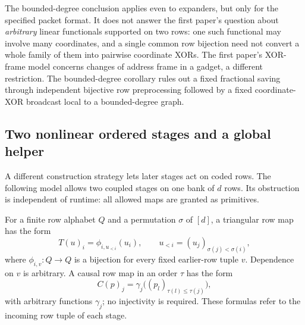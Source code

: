 The bounded-degree conclusion applies even to expanders, but only for the
specified packet format.  It does not answer the first paper's question about
\emph{arbitrary} linear functionals supported on two rows: one such functional
may involve many coordinates, and a single common row bijection need not
convert a whole family of them into pairwise coordinate XORs.
The first paper's XOR-frame model concerns changes of address frame in a
gadget, a different restriction.  The bounded-degree corollary rules out a
fixed fractional saving through independent bijective row preprocessing
followed by a fixed coordinate-XOR broadcast local to a bounded-degree graph.

\subsection{Two nonlinear ordered stages and a global helper}\label{subsec:local-two-stage}

A different construction strategy lets later stages act on coded rows.
The following model allows two coupled stages on one bank of $d$ rows.
Its obstruction is independent of runtime: all allowed maps are granted as
primitives.

\begin{definition}\label{def:local-triangular-causal}
For a finite row alphabet $Q$ and a permutation $\sigma$ of $[d]$, a triangular
row map has the form
\[
  T(u)_i=\phi_{i,u_{<i}}(u_i),\qquad
  u_{<i}=(u_j)_{\sigma(j)<\sigma(i)},
\]
where $\phi_{i,v}:Q\to Q$ is a bijection for every fixed earlier-row tuple
$v$.  Dependence on $v$ is arbitrary.  A causal row map in an order $\tau$ has
the form
\[
  C(p)_j=\gamma_j\bigl((p_l)_{\tau(l)\le\tau(j)}\bigr),
\]
with arbitrary functions $\gamma_j$; no injectivity is required.
These formulas refer to the incoming row tuple of each stage.
\end{definition}

